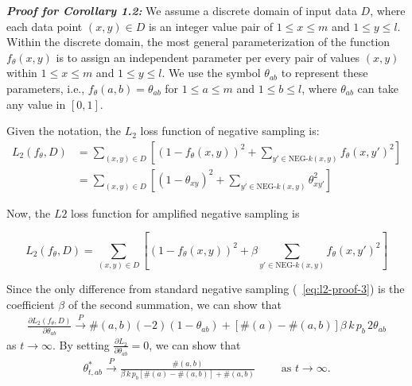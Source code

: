 \textbf{\textit{Proof for Corollary 1.2:}} 
We assume a discrete domain of input data $D$, where each data point $(x, y) \in D$ is an integer value pair of $1 \le x \le m$ and $1 \le y \le l$. Within the discrete domain, the most general parameterization of the function $f_{\theta}(x, y)$ is to assign an independent parameter per every pair of values $(x, y)$ within $1 \le x \le m$ and $1 \le y \le l$. We use the symbol $\theta_{ab}$ to represent these parameters, i.e., $f_{\theta}(a, b) = \theta_{ab}$ for $1 \le a \le m$ and $1 \le b \le l$, where $\theta_{ab}$ can take any value in $[0, 1]$.

Given the notation, the $L_2$ loss function of negative sampling is:
\begin{align}
L_2(f_{\theta},D) &= \sum_{(x,y)\in D} \left[(1 - f_{\theta}(x, y))^2 + \sum_{y' \in \text{NEG-}k(x,y)} f_{\theta}(x, y')^2 \right] \label{eq:l2-proof-3}\\
&= \sum_{(x,y)\in D} \left[(1 - \theta_{xy})^2 + \sum_{y' \in \text{NEG-}k(x,y)} \theta_{xy'}^2 \right] \label{eq:l2-proof1}
\end{align}


Now, the $L2$ loss function for amplified negative sampling is 

\begin{equation}
L_2(f_\theta,D)   = \sum_{(x,y)\in D} \left[(1 - f_{\theta}(x, y))^2 + \beta \sum_{y' \in \text{NEG-}k(x,y)} f_{\theta}(x, y')^2 \right]
\end{equation}




Since the only difference from standard negative sampling (~\ref{eq:l2-proof-3})  is the coefficient $\beta$ of the second summation, we can show that
\begin{equation}
\begin{array}{l}
\frac{\partial L_2(f_{\theta},D)}{\partial \theta_{ab}}  \xrightarrow{P} \#(a,b)(-2)(1-\theta_{ab}) + [\#(a) - \#(a,b)] \beta \, k\, p_{b} \, 2\theta_{ab}

\end{array}
\end{equation}
as $t \rightarrow \infty$. By setting $\frac{\partial L_2}{\partial \theta_{ab}} = 0$, we can show that
\begin{equation}
\begin{array}{l}
\theta_{t,ab}^{*} \xrightarrow{P} \frac{\#(a,b)}{\beta\, k \,p_{b} [\#(a)- \#(a,b)] + \#(a,b)} \qquad\text{ as } t \rightarrow \infty.
\end{array}
\label{eq:amplifyed}
\end{equation}

